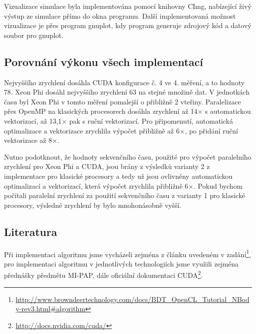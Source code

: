 \documentclass[12pt]{article}
\begin{document}
Vizualizace simulace byla implementována pomocí kni\-hovny CImg, nabí\-zející ži\-vý výstup ze simulace přímo do okna programu.
Další implementovaná možnost vizualizace je přes program gnuplot,
kdy program generuje zdrojový kód a datový soubor pro gnuplot.

\subsection{Porovnání výkonu všech implementací}
Nejvyššího zrychlení dosáhla CUDA konfigurace č. 4 ve 4. měření, a to hodnoty 78.
Xeon Phi dosáhl nejvyššího zrychlení 63 na stejné množině dat. V jednotkách času byl Xeon Phi v tomto měření pomalejší o přibližně 2 vteřiny.
Paralelizace přes OpenMP na klasických procesorech dosáhla zrychlení až 14${\times}$ s automatickou vektorizací, až 13,1${\times}$ pak s ruční vektorizací.
Pro připomenutí, automatická optimalizace a vektorizace zrychlila výpočet přibližně až 6${\times}$, po přidání ruční vektorizace až 8${\times}$.

Nutno podotknout, že hodnoty sekvenčního času, použité pro výpočet paralelního zrychlení pro Xeon Phi a CUDA,
jsou brány z výsledků varianty 2 z implementace pro klasické procesory
a tedy už jsou ovlivněny automatickou optimalizací a vektorizací, která výpočet zrychlila přibližně 6${\times}$.
Pokud bychom počítali paralelní zrychlení za použití sekvenčního času z varianty 1 pro klasické procesory, výsledné zrychlení by bylo mnohonásobně vyšší.

\subsection{Literatura}
Při implementaci algoritmu jsme vycházeli zejména z článku uvedeném v zadání\footnote{\url{http://www.browndeertechnology.com/docs/BDT_OpenCL_Tutorial_NBody-rev3.html#algorithm}},
pro implementaci algoritmu v jednotlivých technologiích jsme využili zejména přednášky předmětu MI-PAP, dále oficiální dokumentaci CUDA\footnote{\url{http://docs.nvidia.com/cuda/}}.
\end{document}
